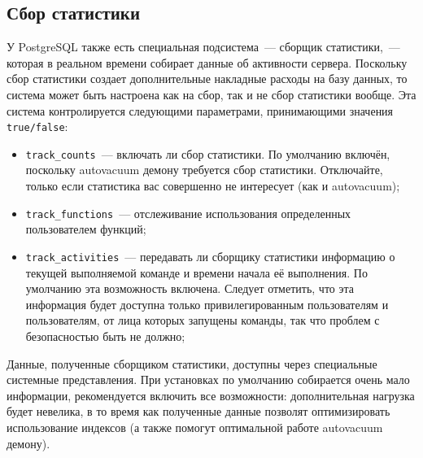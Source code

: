 \subsection{Сбор статистики}


У PostgreSQL также есть специальная подсистема~--- сборщик статистики,~--- которая в реальном времени собирает данные об активности сервера. Поскольку сбор статистики создает дополнительные накладные расходы на базу данных, то система может быть настроена как на сбор, так и не сбор статистики вообще. Эта система контролируется следующими параметрами, принимающими значения \lstinline!true/false!:

\begin{itemize}
  \item \lstinline!track_counts!~--- включать ли сбор статистики. По умолчанию включён, поскольку autovacuum демону требуется сбор статистики. Отключайте, только если статистика вас совершенно не интересует (как и autovacuum);
  \item \lstinline!track_functions!~--- отслеживание использования определенных пользователем функций;
  \item \lstinline!track_activities!~--- передавать ли сборщику статистики информацию о текущей выполняемой команде и времени начала её выполнения. По умолчанию эта возможность включена. Следует отметить, что эта информация будет доступна только привилегированным пользователям и пользователям, от лица которых запущены команды, так что проблем с безопасностью быть не должно;
\end{itemize}

Данные, полученные сборщиком статистики, доступны через специальные системные представления. При установках по умолчанию собирается очень мало информации, рекомендуется включить все возможности: дополнительная нагрузка будет невелика, в то время как полученные данные позволят оптимизировать использование индексов (а также помогут оптимальной работе autovacuum демону).
